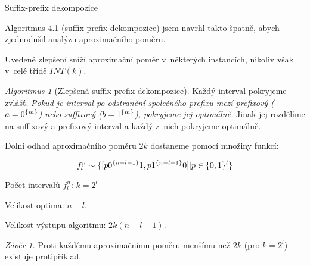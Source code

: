 \documentclass{beamer}
\theoremstyle{remark}
\newtheorem{algorithm}{Algoritmus}
\newtheorem{conclusion}{Závěr}
\begin{document}
\begin{frame}{Suffix-prefix dekompozice}

Algoritmus 4.1 (suffix-prefix dekompozice) jsem navrhl takto špatně, abych zjednodušil analýzu aproximačního poměru.

Uvedené zlepšení sníží aproximační poměr v~některých instancích, nikoliv však v~celé třídě $INT(k)$.

\begin{algorithm}[Zlepšená suffix-prefix dekompozice]
Každý interval pokryjeme zvlášť.
\emph{Pokud je interval po odstranění společného prefixu mezí prefixový ($a = 0^{\{m\}}$) nebo suffixový ($b = 1^{\{m\}}$), pokryjeme jej optimálně.}
Jinak jej rozdělíme na suffixový a prefixový interval a každý z~nich pokryjeme optimálně.
\end{algorithm}


Dolní odhad aproximačního poměru $2k$ dostaneme pomocí množiny  funkcí:

$$
f_l^n \sim \{[p 0^{\{n-l-1\}} 1, p 1^{\{n-l-1\}} 0] | p \in \{0, 1\}^l\}
$$

Počet intervalů $f_l^n$: $k = 2^l$

Velikost optima: $n-l$.

Velikost výstupu algoritmu: $2k (n-l-1)$.

\begin{conclusion}
Proti každému aproximačnímu poměru menšímu než $2k$ (pro $k = 2^l$) existuje protipříklad.
\end{conclusion}
\end{frame}
\end{document}
